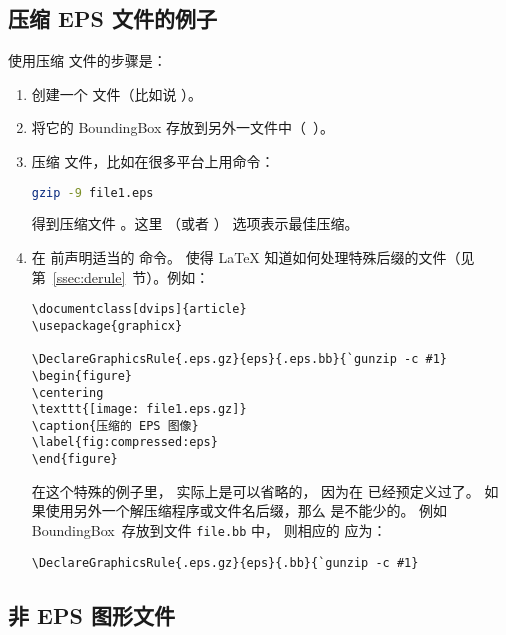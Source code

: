 \subsection{压缩 EPS 文件的例子}\label{ssec:compresseps}
使用压缩  文件的步骤是：
\begin{enumerate}
	\item 创建一个  文件（比如说 ）。
	\item 将它的 BoundingBox 存放到另外一文件中（~）。
	\item 压缩    文件，比如在很多平台上用命令：
	\begin{lstlisting}[language=bash]
	gzip -9 file1.eps
	\end{lstlisting}
	得到压缩文件 。这里 （或者 ） 选项表示最佳压缩。
	\item 在 前声明适当的  命令。
	使得 \LaTeX{} 知道如何处理特殊后缀的文件（见第~\ref{ssec:derule}~节）。例如：
\begin{lstlisting}
\documentclass[dvips]{article}
\usepackage{graphicx}

\DeclareGraphicsRule{.eps.gz}{eps}{.eps.bb}{`gunzip -c #1}
\begin{figure}
\centering
\texttt{[image: file1.eps.gz]}
\caption{压缩的 EPS 图像}
\label{fig:compressed:eps}
\end{figure}

\end{lstlisting}
	在这个特殊的例子里， 实际上是可以省略的，
	因为在  已经预定义过了。
	如果使用另外一个解压缩程序或文件名后缀，那么  是不能少的。
	例如 BoundingBox~存放到文件 \texttt{file.bb} 中，
	则相应的  应为：
\begin{lstlisting}
\DeclareGraphicsRule{.eps.gz}{eps}{.bb}{`gunzip -c #1}
\end{lstlisting}
\end{enumerate}


\subsection{非 EPS 图形文件}\label{ssec:noneps}

